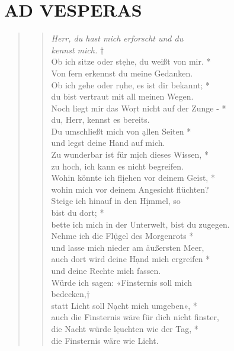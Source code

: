 \section[VESPERAE]{AD VESPERAS}



\def\greinitialformat#1{{\fontsize{40}{40}\selectfont #1}}
\gresetfirstlineaboveinitial{\small \textcolor{red}{Ps 139a}}{}
\setaboveinitialseparation{0.72mm}


\vspace{0.3cm}
\begin{quote}
 


\begin{verse}
 \textit{Herr, du hast mich erforscht und du \\ kennst mich.} †\\
Ob ich sitze oder st\d ehe, du weißt von mir. *\\
Von fern erkennst du meine Gedanken.\\ \vin 
Ob ich gehe oder r\d uhe, es ist dir bekannt; *\\ \vin
du bist vertraut mit all meinen Wegen.\\
Noch liegt mir das Wo\d rt nicht auf der Zunge - *\\
du, Herr, kennst es bereits.\\ \vin
Du umschließt mich von \d allen Seiten *\\ \vin
und legst deine Hand auf mich.\\
Zu wunderbar ist für m\d ich dieses Wissen, *\\
zu hoch, ich kann es nicht begreifen.\\ \vin 
Wohin könnte ich fl\d iehen vor deinem Geist, *\\ \vin
wohin mich vor deinem Angesicht flüchten? \\
Steige ich hinauf in den H\d immel, so \\bist du dort; *\\
bette ich mich in der Unterwelt, bist du zugegen.\\ 
\vin Nehme ich die Fl\d ügel des Morgenrots *\\
\vin und lasse mich nieder am äußersten Meer, \\ 
auch dort wird deine H\d and mich ergreifen *\\ 
und deine Rechte mich fassen.\\
\vin Würde ich sagen: «Finsternis soll mich\\ \vin bedecken,†\\
\vin statt Licht soll N\d acht mich umgeben», *\\
\vin auch die Finsternis wäre für dich nicht finster, \\ 
die Nacht würde l\d euchten wie der Tag, *\\ 
die Finsternis wäre wie Licht.\\
\end{verse}
\end{quote}

